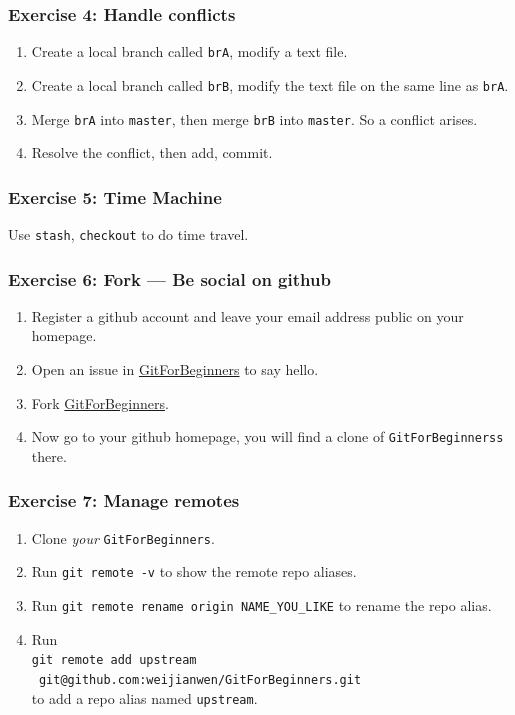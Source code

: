 \documentclass[11pt,ignorenonframetext,]{beamer}
\begin{document}
\begin{frame}[fragile]\frametitle{Exercise 4: Handle conflicts}

\begin{enumerate}[1.]
\item
  Create a local branch called \texttt{brA}, modify a text file.
\item
  Create a local branch called \texttt{brB}, modify the text file on the same line as \texttt{brA}.
\item
  Merge \texttt{brA} into \texttt{master}, then merge \texttt{brB} into \texttt{master}. So a conflict arises.
\item
  Resolve the conflict, then add, commit.
\end{enumerate}
\end{frame}

\begin{frame}[fragile]\frametitle{Exercise 5: Time Machine}
Use \texttt{stash}, \texttt{checkout} to do time travel.
\end{frame}

\begin{frame}[fragile]\frametitle{Exercise 6: Fork --- Be social on github}

\begin{enumerate}[1.]
\item
  Register a github account and leave your email address public on your homepage.
\item
  Open an issue in
  \href{https://github.com/weijianwen/GitForBeginners/issues}{GitForBeginners}
  to say hello.
\item
  Fork 
  \href{https://github.com/weijianwen/GitForBeginners/issues}{GitForBeginners}.
\item
  Now go to your github homepage, you will find a clone of \texttt{GitForBeginnerss} there.
\end{enumerate}
\end{frame}

\begin{frame}[fragile]\frametitle{Exercise 7: Manage remotes}
\begin{enumerate}[1.]
\item
  Clone \emph{your} \texttt{GitForBeginners}.
\item
  Run \texttt{git remote -v} to show the remote repo aliases.
\item
  Run \texttt{git remote rename origin NAME\_YOU\_LIKE} to rename the repo alias.
\item
  Run \\
  \texttt{git remote add upstream \ git@github.com:weijianwen/GitForBeginners.git} \\
  to add a repo alias named \texttt{upstream}.
\end{enumerate}
\end{frame}
\end{document}
